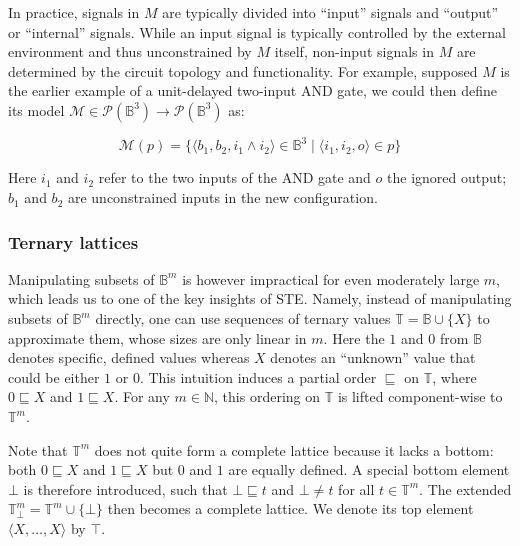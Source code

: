 In practice, signals in $M$ are typically divided into ``input'' signals and ``output'' or ``internal'' signals. While an input signal is typically controlled by the external environment and thus unconstrained by $M$ itself, non-input signals in $M$ are determined by the circuit topology and functionality. For example, supposed $M$ is the earlier example of a unit-delayed two-input AND gate, we could then define its model $\mathcal{M} \in \mathcal{P}(\mathbb{B}^{3}) \rightarrow \mathcal{P}(\mathbb{B}^{3})$ as:


\begin{equation*}
\mathcal{M}(p) = \{ \langle b_{1}, b_{2}, i_{1} \wedge i_{2} \rangle \in \mathbb{B}^{3} \mid \langle i_{1}, i_{2}, o \rangle \in p \}
\end{equation*}

\noindent Here $i_{1}$ and $i_{2}$ refer to the two inputs of the AND gate and $o$ the ignored output; $b_{1}$ and $b_{2}$ are unconstrained inputs in the new configuration.

\subsubsection{Ternary lattices}

Manipulating subsets of $\mathbb{B}^{m}$ is however impractical for even moderately large $m$, which leads us to one of the key insights of STE. Namely, instead of manipulating subsets of $\mathbb{B}^{m}$ directly, one can use sequences of ternary values $\mathbb{T} = \mathbb{B} \cup \{ X \} $ to approximate them, whose sizes are only linear in $m$. Here the $1$ and $0$ from $\mathbb{B}$ denotes specific, defined values whereas $X$ denotes an ``unknown'' value that could be either $1$ or $0$. This intuition induces a partial order $\sqsubseteq$ on $\mathbb{T}$, where $0 \sqsubseteq X$ and $1 \sqsubseteq X$\footnotemark. For any $m \in \mathbb{N}$, this ordering on $\mathbb{T}$ is lifted component-wise to $\mathbb{T}^{m}$.



Note that $\mathbb{T}^{m}$ does not quite form a complete lattice because it lacks a bottom: both $0 \sqsubseteq X$ and $1 \sqsubseteq X$ but $0$ and $1$ are equally defined. A special bottom element $\bot$ is therefore introduced, such that $\bot \sqsubseteq t$ and $\bot \neq t$ for all $t \in \mathbb{T}^{m}$. The extended $\mathbb{T}_{\bot}^{m} = \mathbb{T}^{m} \cup \{ \bot \}$ then becomes a complete lattice. We denote its top element $\langle X, \dots, X \rangle$ by $\top$.

